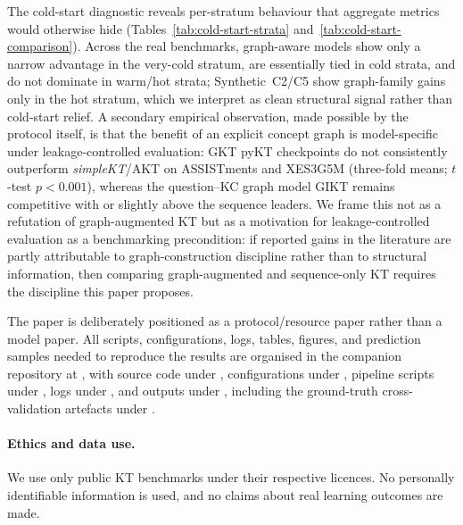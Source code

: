 \documentclass[runningheads]{llncs}
\begin{document}
The cold-start diagnostic reveals per-stratum behaviour that aggregate
metrics would otherwise hide (Tables~\ref{tab:cold-start-strata}
and~\ref{tab:cold-start-comparison}). Across the real benchmarks,
graph-aware models show only a narrow advantage in the very-cold
stratum, are essentially tied in cold strata, and do not dominate in
warm/hot strata; Synthetic~C2/C5 show graph-family gains only in the
hot stratum, which we interpret as clean structural signal rather than
cold-start relief. A secondary empirical observation, made
possible by the protocol itself, is that the benefit of an explicit
concept graph is model-specific under leakage-controlled evaluation: GKT
pyKT checkpoints do not consistently outperform \textit{simpleKT}/AKT on
ASSISTments and XES3G5M (three-fold means; $t$-test $p{<}0.001$), whereas
the question--KC graph model GIKT remains competitive with or slightly
above the sequence leaders. We frame this not as a refutation of
graph-augmented KT but as a motivation for leakage-controlled
evaluation as a benchmarking precondition: if reported gains in the
literature are partly attributable to graph-construction discipline
rather than to structural information, then comparing graph-augmented
and sequence-only KT requires the discipline this paper proposes.

The paper is deliberately positioned as a protocol/resource paper rather
than a model paper. All scripts, configurations, logs, tables, figures,
and prediction samples needed to reproduce the results are organised in
the companion repository at ,
with source code under , configurations under ,
pipeline scripts under , logs under , and
outputs under , including the ground-truth
cross-validation artefacts under .
\paragraph{Ethics and data use.}
We use only public KT benchmarks under their respective licences. No
personally identifiable information is used, and no claims about real
learning outcomes are made.


\end{document}
